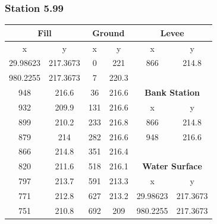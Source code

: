 \subsubsection{Station 5.99}
\begin{center}

\begin{tabular}{|cc||cc||cc|}
    \hline
    \multicolumn{2}{|c||}{\textbf{Fill}} & \multicolumn{2}{c||}{\textbf{Ground}} & \multicolumn{2}{c|}{\textbf{Levee}}            \\ 
    \hline
    x        & y                      & x    & y                             & x        & y                                  \\
    29.98623 & 217.3673               & 0    & 221                           & 866      & 214.8                              \\
    980.2255 & 217.3673               & 7    & 220.3                         &          &                                    \\
    948      & 216.6                  & 36   & 216.6                         & \multicolumn{2}{c|}{\textbf{Bank Station }}    \\ 
    \cline{5-6}
    932      & 209.9                  & 131  & 216.6                         & x        & y                                  \\
    899      & 210.2                  & 233  & 216.8                         & 866      & 214.8                              \\
    879      & 214                    & 282  & 216.6                         & 948      & 216.6                              \\
    866      & 214.8                  & 351  & 216.4                         &          &                                    \\
    820      & 211.6                  & 518  & 216.1                         & \multicolumn{2}{c|}{\textbf{Water Surface }}   \\ 
    \cline{5-6}
    797      & 213.7                  & 591  & 213.3                         & x        & y                                  \\
    771      & 212.8                  & 627  & 213.2                         & 29.98623 & 217.3673                           \\
    751      & 210.8                  & 692  & 209                           & 980.2255 & 217.3673                           \\

\end{tabular}
\end{center}

